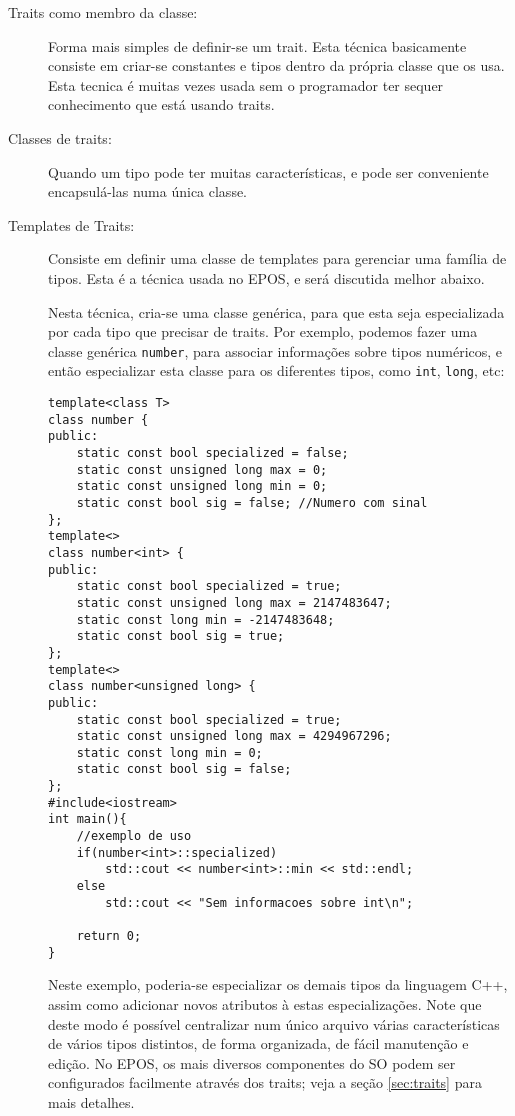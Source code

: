 \begin{description}
\item[Traits como membro da classe:] Forma mais simples de definir-se um trait. Esta técnica basicamente consiste em criar-se constantes e tipos dentro da própria classe que os usa. Esta tecnica é muitas vezes usada sem o programador ter sequer conhecimento que está usando traits.

\item[Classes de traits:] Quando um tipo pode ter muitas características, e pode ser conveniente encapsulá-las numa única classe.

\item[Templates de Traits:] Consiste em definir uma classe de templates para gerenciar uma família de tipos. Esta é a técnica usada no EPOS, e será discutida melhor abaixo.

Nesta técnica, cria-se uma classe genérica, para que esta seja especializada por cada tipo que precisar de traits. Por exemplo, podemos fazer uma classe genérica \verb+number+, para associar informações sobre tipos numéricos, e então especializar esta classe para os diferentes tipos, como \verb+int+, \verb+long+, etc:

\begin{lstlisting}
template<class T>
class number {
public:
	static const bool specialized = false;
	static const unsigned long max = 0;
	static const unsigned long min = 0;
	static const bool sig = false; //Numero com sinal
};
template<>
class number<int> {
public:
	static const bool specialized = true;
	static const unsigned long max = 2147483647;
	static const long min = -2147483648;
	static const bool sig = true;
};
template<>
class number<unsigned long> {
public:
	static const bool specialized = true;
	static const unsigned long max = 4294967296;
	static const long min = 0;
	static const bool sig = false;
};
#include<iostream>
int main(){
	//exemplo de uso
	if(number<int>::specialized)
		std::cout << number<int>::min << std::endl;
	else
		std::cout << "Sem informacoes sobre int\n";
	
	return 0;
}
\end{lstlisting}

Neste exemplo, poderia-se especializar os demais tipos da linguagem C++, assim como adicionar novos atributos à estas especializações. Note que deste modo é possível centralizar num único arquivo várias características de vários tipos distintos, de forma organizada, de fácil manutenção e edição. No EPOS, os mais diversos componentes do SO podem ser configurados facilmente através dos traits; veja a seção \ref{sec:traits} para mais detalhes.


\end{description}

